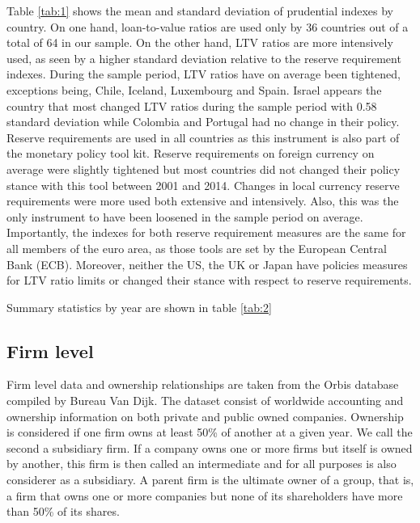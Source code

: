\documentclass[12pt]{article}
\begin{document}
	Table \ref{tab:1} shows the mean and standard deviation of prudential indexes by country. On one hand, loan-to-value ratios are used only by 36 countries out of a total of 64 in our sample. On the other hand, LTV ratios are more intensively used, as seen by a higher standard deviation relative to the reserve requirement indexes. During the sample period, LTV ratios have on average been tightened, exceptions being, Chile, Iceland, Luxembourg and Spain. Israel appears the country that most changed LTV ratios during the sample period with 0.58 standard deviation while Colombia and Portugal had no change in their policy. Reserve requirements are used in all countries as this instrument is also part of the monetary policy tool kit. Reserve requirements on foreign currency on average were slightly tightened but most countries did not changed their policy stance with this tool between 2001 and 2014. Changes in local currency reserve requirements were more used both extensive and intensively. Also, this was the only instrument to have been loosened in the sample period on average. Importantly, the indexes for both reserve requirement measures are the same for all members of the euro area, as those tools are set by the European Central Bank (ECB). Moreover, neither the US, the UK or Japan have policies measures for LTV ratio limits or changed their stance with respect to reserve requirements.   
	
	Summary statistics by year are shown in table \ref{tab:2}
	    
	
    
    
	\subsection{Firm level} \label{subsec:firm}
	Firm level data and ownership relationships are taken from the Orbis database compiled by Bureau Van Dijk.	The dataset consist of worldwide accounting and ownership information on both private and public owned companies. Ownership is considered if one firm owns at least 50\% of another at a given year. We call the second a subsidiary firm. If a company owns one or more firms but itself is owned by another, this firm is then called an intermediate and for all purposes is also considerer as a subsidiary. A parent firm is the ultimate owner of a group, that is, a firm that owns one or more companies but none of its shareholders have more than 50\% of its shares.
	
\end{document}
